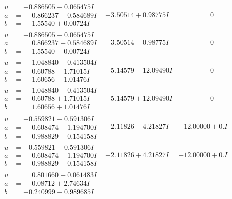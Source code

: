 \documentclass[1p]{elsarticle_modified}
\theoremstyle{definition}
\begin{document}
$$\begin{array}{c|c|c}
\begin{aligned}
u &= -0.886505 + 0.065475 I \\
a &= \phantom{-}0.866237 - 0.584689 I \\
b &= \phantom{-}1.55540 + 0.00724 I\end{aligned}
 & -3.50514 + 0.98775 I & \phantom{-0.000000 } 0 \\ \hline\begin{aligned}
u &= -0.886505 - 0.065475 I \\
a &= \phantom{-}0.866237 + 0.584689 I \\
b &= \phantom{-}1.55540 - 0.00724 I\end{aligned}
 & -3.50514 - 0.98775 I & \phantom{-0.000000 } 0 \\ \hline\begin{aligned}
u &= \phantom{-}1.048840 + 0.413504 I \\
a &= \phantom{-}0.60788 - 1.71015 I \\
b &= \phantom{-}1.60656 - 1.01476 I\end{aligned}
 & -5.14579 - 12.09490 I & \phantom{-0.000000 } 0 \\ \hline\begin{aligned}
u &= \phantom{-}1.048840 - 0.413504 I \\
a &= \phantom{-}0.60788 + 1.71015 I \\
b &= \phantom{-}1.60656 + 1.01476 I\end{aligned}
 & -5.14579 + 12.09490 I & \phantom{-0.000000 } 0 \\ \hline\begin{aligned}
u &= -0.559821 + 0.591306 I \\
a &= \phantom{-}0.608474 + 1.194700 I \\
b &= \phantom{-}0.988829 - 0.154158 I\end{aligned}
 & -2.11826 - 4.21827 I & -12.00000 + 0. I\phantom{ +0.000000I} \\ \hline\begin{aligned}
u &= -0.559821 - 0.591306 I \\
a &= \phantom{-}0.608474 - 1.194700 I \\
b &= \phantom{-}0.988829 + 0.154158 I\end{aligned}
 & -2.11826 + 4.21827 I & -12.00000 + 0. I\phantom{ +0.000000I} \\ \hline\begin{aligned}
u &= \phantom{-}0.801660 + 0.061483 I \\
a &= \phantom{-}0.08712 + 2.74634 I \\
b &= -0.240999 + 0.989685 I\end{aligned}

\end{array}$$
\end{document}
